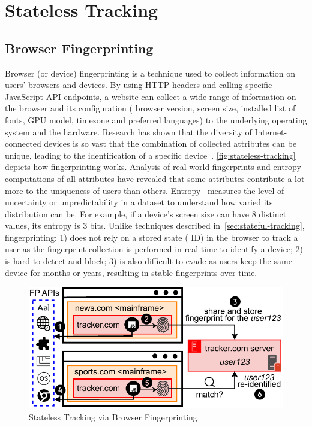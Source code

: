 \vspace{-1mm}
\section{Stateless Tracking}
\label{sec:stateless-tracking}

\vspace{-2mm}
\subsection{Browser Fingerprinting}
\label{sec:browser-fingerprinting}
\vspace{-2mm}

Browser (or device) fingerprinting is a technique used to collect information on users’ browsers and devices. 
%
By using HTTP headers and calling specific JavaScript API endpoints, a website can collect a wide range of information on the browser and its configuration (\eg{} browser version, screen size, installed list of fonts, GPU model, timezone and preferred languages) to the underlying operating system and the hardware. 
%
Research has shown that the diversity of Internet-connected devices is so vast that the combination of collected attributes can be unique, leading to the identification of a specific device~\cite{eckersleyHowUniqueYour2010, laperdrixBeautyBeastDiverting2016,gomez-boixHidingCrowdAnalysis2018}. 
%
\autoref{fig:stateless-tracking} depicts how fingerprinting works.
%
Analysis of real-world fingerprints and entropy computations of all attributes have revealed that some attributes contribute a lot more to the uniqueness of users than others. 
%
Entropy~\cite{bacis2024assessing} measures the level of uncertainty or unpredictability in a dataset to understand how varied its distribution can be. 
%
For example, if a device's screen size can have 8 distinct values, its entropy is 3 bits.
%
Unlike techniques described in~\autoref{sec:stateful-tracking}, fingerprinting: 
%
1) does not rely on a stored state (\ie{} ID) in the browser to track a user as the fingerprint collection is performed in real-time to identify a device; 
%
2) is hard to detect and block; 
%
3) is also difficult to evade as users keep the same device for months or years, resulting in stable fingerprints over time.

\begin{figure}[htbp]
    \vspace{-2mm}
    \centering
    \includegraphics[width=0.8\linewidth]{figures/tracking-mechanisms-fingerprinting.pdf}
    \caption{Stateless Tracking via Browser Fingerprinting}
    \label{fig:stateless-tracking}
    \vspace{-2mm}
\end{figure}


